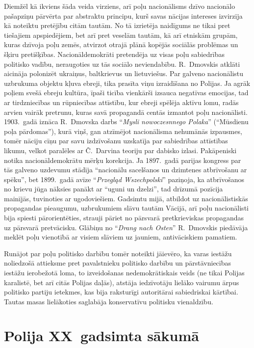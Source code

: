 \documentclass[twoside,a5paper,12pt,fleqn,openany]{extbook}
\newcommand{\pltxti}[1]{\textit{\textpolish{#1}}}
\newcommand{\detxti}[1]{\textit{\textgerman{#1}}}
\begin{document}
Diemžēl kā ikviens šāda veida virziens, arī poļu nacionālisms dzīvo nacionālo pašapziņu pārvērta par abstraktu principu, kurš savas nācijas intereses izvirzīja kā noteiktu pretējību citām tautām. No tā izrietēja naidīgums ne tikai pret tiešajiem apspiedējiem, bet arī pret veselām tautām, kā arī etniskām grupām, kuras dzīvoja poļu zemēs, atvirzot otrajā plānā kopējās sociālās problēmas un šķiru pretišķības. Nacionāldemokrāti pretendēja uz visas poļu sabiedrības politisko vadību, neraugoties uz tās sociālo neviendabību. R.~Dmovskis atklāti aicināja polonizēt ukraiņus, baltkrievus un lietuviešus. Par galveno nacionālistu uzbrukuma objektu kļuva ebreji, tika prasīta viņu izraidīšana no Polijas. Ja agrāk poļiem svešā ebreju kultūra, īpaši ticība vienkārši izsauca negatīvas emocijas, tad ar tirdzniecības un rūpniecības attīstību, kur ebreji spēlēja aktīvu lomu, radās arvien vairāk pretrunu, kuras savā propagandā centās izmantot poļu nacionālisti. 1903.~gadā iznāca R.~Dmovska darbs ``\pltxti{Mysli nowoczesnnego Polaka}'' (``Mūsdienu poļa pārdomas''), kurā viņš, gan atzīmējot nacionālisma nehumānās izpausmes, tomēr nāciju cīņu par savu izdzīvošanu uzskatīja par sabiedrības attīstības likumu, velkot paralēles ar Č.~Darvina teoriju par dabisko izlasi. Pakāpeniski notika nacionāldemokrātu mērķu korekcija. Ja 1897.~gadā parijas kongress par tās galveno uzdevumu stādīja ``nacionālu sacelšanos un dzimtenes atbrīvošanu ar spēku'', bet 1899.~gadā avīze ``\pltxti{Przegląd Wszechpolski}'' paziņoja, ka atbrīvošanos no krievu jūga nāksies panākt ar ``uguni un dzelzi'', tad drīzumā pozīcija mainījās, tuvinoties ar ugodoviešiem. Gadsimtu mijā, atbildot uz nacionālistiskās propagandas pieaugumu, uzbrukumiem slāvu tautām Vācijā, arī poļu nacionālisti bija spiesti pārorientēties, strauji pāriet no pārsvarā pretkrieviskas propagandas uz pārsvarā pretvācisku. Glābiņu no ``\detxti{Drang nach Osten}'' R.~Dmovskis piedāvāja meklēt poļu vienotībā ar visiem slāviem uz jauniem, antivāciskiem pamatiem.

Runājot par poļu politisko darbību tomēr noteikti jāievēro, ka varas iestāžu noliedzošā attieksme pret pavalstnieku politisko darbību un pārstāvniecības iestāžu ierobežotā loma, to izveidošanas nedemokrātiskais veids (ne tikai Polijas karalistē, bet arī citās Polijas daļās), atstāja iedzīvotāju lielāko vairumu ārpus politisko partiju ietekmes, kas bija raksturīgi autoritārai sabiedriskai kārtībai. Tautas masas lielākoties saglabāja konservatīvu politisku vienaldzību.

\section{Polija XX~gadsimta sākumā}
\end{document}
